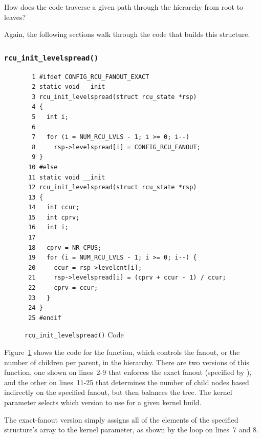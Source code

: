 \QuickQuiz{}
	How does the code traverse a given path through
	the  hierarchy from root to leaves?
 \QuickQuizEnd

Again, the following sections walk through the code that builds this
structure.

\subsubsection{\tt rcu\_init\_levelspread()}
\label{app:rcuimpl:rcutreewt:rcu-init-levelspread}

\begin{figure}[tbp]
{ \scriptsize
\begin{verbatim}
  1 #ifdef CONFIG_RCU_FANOUT_EXACT
  2 static void __init
  3 rcu_init_levelspread(struct rcu_state *rsp)
  4 {
  5   int i;
  6
  7   for (i = NUM_RCU_LVLS - 1; i >= 0; i--)
  8     rsp->levelspread[i] = CONFIG_RCU_FANOUT;
  9 }
 10 #else
 11 static void __init
 12 rcu_init_levelspread(struct rcu_state *rsp)
 13 {
 14   int ccur;
 15   int cprv;
 16   int i;
 17
 18   cprv = NR_CPUS;
 19   for (i = NUM_RCU_LVLS - 1; i >= 0; i--) {
 20     ccur = rsp->levelcnt[i];
 21     rsp->levelspread[i] = (cprv + ccur - 1) / ccur;
 22     cprv = ccur;
 23   }
 24 }
 25 #endif
\end{verbatim}
}
\caption{{\tt rcu\_init\_levelspread()} Code}
\label{fig:app:rcuimpl:rcutreewt:Code for rcu-init-levelspread}
\end{figure}

Figure~\ref{fig:app:rcuimpl:rcutreewt:Code for rcu-init-levelspread}
shows the code for the  function, which controls
the fanout, or the number of children per parent,
in the  hierarchy.
There are two versions of this function, one shown on lines~2-9 that
enforces the exact fanout (specified by ),
and the other on lines~11-25 that determines the number of child nodes
based indirectly on the specified fanout, but then balances the tree.
The  kernel parameter selects which version
to use for a given kernel build.

The exact-fanout version simply assigns all of the elements of the
specified  structure's  array to
the  kernel parameter, as shown by the loop
on lines~7 and 8.

